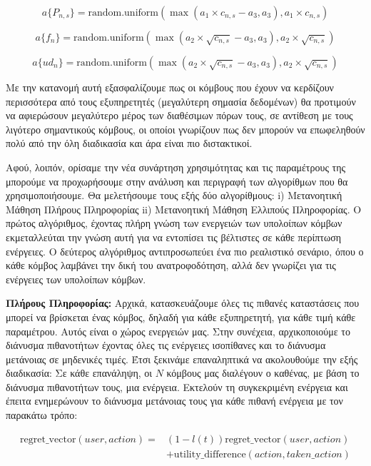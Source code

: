 \[a\{P_{n,s}\} = \text{random.uniform}\left(\max\left(a_1 \times c_{n,s} - a_3, a_3\right), a_1 \times c_{n,s}\right)\]

\[a\{f_n\} = \text{random.uniform}\left(\max\left(a_2 \times \sqrt{c_{n,s}} - a_3, a_3\right), a_2 \times \sqrt{c_{n,s}}\right)\]

\[a\{ud_n\} = \text{random.uniform}\left(\max\left(a_2 \times \sqrt{c_{n,s}} - a_3, a_3\right), a_2 \times \sqrt{c_{n,s}}\right)\]

\noindent
Με την κατανομή αυτή εξασφαλίζουμε πως οι κόμβους που έχουν να κερδίζουν περισσότερα από τους εξυπηρετητές (μεγαλύτερη σημασία δεδομένων) θα προτιμούν να αφιερώσουν μεγαλύτερο μέρος των διαθέσιμων πόρων τους, σε αντίθεση με τους λιγότερο σημαντικούς κόμβους, οι οποίοι γνωρίζουν πως δεν μπορούν να επωφεληθούν πολύ από την όλη διαδικασία και άρα είναι πιο διστακτικοί.

Αφού, λοιπόν, ορίσαμε την νέα συνάρτηση χρησιμότητας και τις παραμέτρους της μπορούμε να προχωρήσουμε στην ανάλυση και περιγραφή των αλγορίθμων που θα χρησιμοποιήσουμε. Θα μελετήσουμε τους εξής δύο αλγορίθμους: i) Μετανοητική Μάθηση Πλήρους Πληροφορίας ii) Μετανοητική Μάθηση Ελλιπούς Πληροφορίας. Ο πρώτος αλγόριθμος, έχοντας πλήρη γνώση των ενεργειών των υπολοίπων κόμβων εκμεταλλεύται την γνώση αυτή για να εντοπίσει τις βέλτιστες σε κάθε περίπτωση ενέργειες. Ο δεύτερος αλγόριθμος αντιπροσωπεύει ένα πιο ρεαλιστικό σενάριο, όπου ο κάθε κόμβος λαμβάνει την δική του ανατροφοδότηση, αλλά δεν γνωρίζει για τις ενέργειες των υπολοίπων κόμβων.

\textbf{Πλήρους Πληροφορίας:} Αρχικά, κατασκευάζουμε όλες τις πιθανές καταστάσεις που μπορεί να βρίσκεται ένας κόμβος, δηλαδή για κάθε εξυπηρετητή, για κάθε τιμή κάθε παραμέτρου. Αυτός είναι ο χώρος ενεργειών μας. Στην συνέχεια, αρχικοποιούμε το διάνυσμα πιθανοτήτων έχοντας όλες τις ενέργειες ισοπίθανες και το διάνυσμα μετάνοιας σε μηδενικές τιμές. Έτσι ξεκινάμε επαναληπτικά να ακολουθούμε την εξής διαδικασία: Σε κάθε επανάληψη, οι $N$ κόμβους μας διαλέγουν ο καθένας, με βάση το διάνυσμα πιθανοτήτων τους, μια ενέργεια. Εκτελούν τη συγκεκριμένη ενέργεια και έπειτα ενημερώνουν το διάνυσμα μετάνοιας τους για κάθε πιθανή ενέργεια με τον παρακάτω τρόπο:

\vspace{-5pt}

\begin{equation}
\begin{split}
    \text{regret\_vector}(user, action) =& \left(1 - l(t)\right) \text{regret\_vector}(user, action)\\
    &+ \text{utility\_difference}(action, taken\_action)
\end{split}
\label{eq27}
\end{equation}

